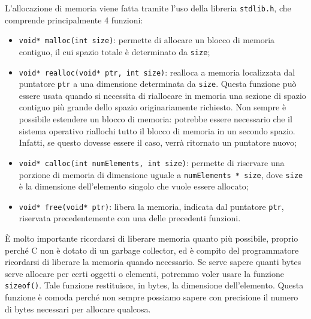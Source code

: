 L'allocazione di memoria viene fatta tramite l'uso della libreria \verb|stdlib.h|, che comprende principalmente 4 funzioni:
\begin{itemize}
    \item \verb|void* malloc(int size)|: permette di allocare un blocco di memoria contiguo, il cui spazio totale è determinato da \verb|size|;
    \item \verb|void* realloc(void* ptr, int size)|: realloca a memoria localizzata dal puntatore \verb|ptr| a una dimensione determinata da \verb|size|. Questa funzione può essere usata quando si necessita di riallocare in memoria una sezione di spazio contiguo più grande dello spazio originariamente richiesto. Non sempre è possibile estendere un blocco di memoria: potrebbe essere necessario che il sistema operativo riallochi tutto il blocco di memoria in un secondo spazio. Infatti, se questo dovesse essere il caso, verrà ritornato un puntatore nuovo;
    \item \verb|void* calloc(int numElements, int size)|: permette di riservare una porzione di memoria di dimensione uguale a \verb|numElements * size|, dove \verb|size| è la dimensione dell'elemento singolo che vuole essere allocato;
    \item \verb|void* free(void* ptr)|: libera la memoria, indicata dal puntatore \verb|ptr|, riservata precedentemente con una delle precedenti funzioni.
\end{itemize}

È molto importante ricordarsi di liberare memoria quanto più possibile, proprio perché C non è dotato di un garbage collector, ed è compito del programmatore ricordarsi di liberare la memoria quando necessario.
\nl
Se serve sapere quanti bytes serve allocare per certi oggetti o elementi, potremmo voler usare la funzione \verb|sizeof()|. Tale funzione restituisce, in bytes, la dimensione dell'elemento. Questa funzione è comoda perché non sempre possiamo sapere con precisione il numero di bytes necessari per allocare qualcosa.